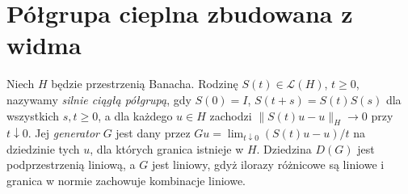 \section{Półgrupa cieplna zbudowana z widma}
\label{sec:pde12-heat}

\begin{definicja}
Niech $H$ będzie przestrzenią Banacha. Rodzinę
$S(t)\in\mathcal L(H)$, $t\ge0$, nazywamy
\emph{silnie ciągłą półgrupą}, gdy $S(0)=I$,
$S(t+s)=S(t)S(s)$ dla wszystkich $s,t\ge0$, a dla
każdego $u\in H$ zachodzi $\|S(t)u-u\|_H\to0$
przy $t\downarrow0$. Jej \emph{generator} $G$ jest
dany przez $Gu=\lim_{t\downarrow0}(S(t)u-u)/t$
na dziedzinie tych $u$, dla których granica istnieje w $H$.
Dziedzina $D(G)$ jest podprzestrzenią liniową, a $G$ jest liniowy,
gdyż ilorazy różnicowe są liniowe i granica w normie
zachowuje kombinacje liniowe.
\end{definicja}


